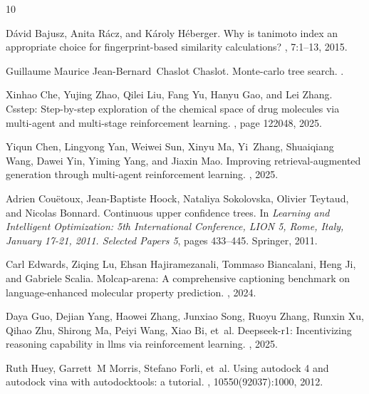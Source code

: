 \documentclass[letterpaper,twocolumn,10pt]{llncs}
\begin{document}
\begin{thebibliography}{10}

D{\'a}vid Bajusz, Anita R{\'a}cz, and K{\'a}roly H{\'e}berger.
\newblock Why is tanimoto index an appropriate choice for fingerprint-based similarity calculations?
, 7:1--13, 2015.

Guillaume Maurice Jean-Bernard~Chaslot Chaslot.
\newblock Monte-carlo tree search.
.

Xinhao Che, Yujing Zhao, Qilei Liu, Fang Yu, Hanyu Gao, and Lei Zhang.
\newblock Csstep: Step-by-step exploration of the chemical space of drug molecules via multi-agent and multi-stage reinforcement learning.
, page 122048, 2025.

Yiqun Chen, Lingyong Yan, Weiwei Sun, Xinyu Ma, Yi~Zhang, Shuaiqiang Wang, Dawei Yin, Yiming Yang, and Jiaxin Mao.
\newblock Improving retrieval-augmented generation through multi-agent reinforcement learning.
, 2025.

Adrien Cou{\"e}toux, Jean-Baptiste Hoock, Nataliya Sokolovska, Olivier Teytaud, and Nicolas Bonnard.
\newblock Continuous upper confidence trees.
\newblock In {\em Learning and Intelligent Optimization: 5th International Conference, LION 5, Rome, Italy, January 17-21, 2011. Selected Papers 5}, pages 433--445. Springer, 2011.

Carl Edwards, Ziqing Lu, Ehsan Hajiramezanali, Tommaso Biancalani, Heng Ji, and Gabriele Scalia.
\newblock Molcap-arena: A comprehensive captioning benchmark on language-enhanced molecular property prediction.
, 2024.

Daya Guo, Dejian Yang, Haowei Zhang, Junxiao Song, Ruoyu Zhang, Runxin Xu, Qihao Zhu, Shirong Ma, Peiyi Wang, Xiao Bi, et~al.
\newblock Deepseek-r1: Incentivizing reasoning capability in llms via reinforcement learning.
, 2025.

Ruth Huey, Garrett~M Morris, Stefano Forli, et~al.
\newblock Using autodock 4 and autodock vina with autodocktools: a tutorial.
, 10550(92037):1000, 2012.


\end{thebibliography}
\end{document}
